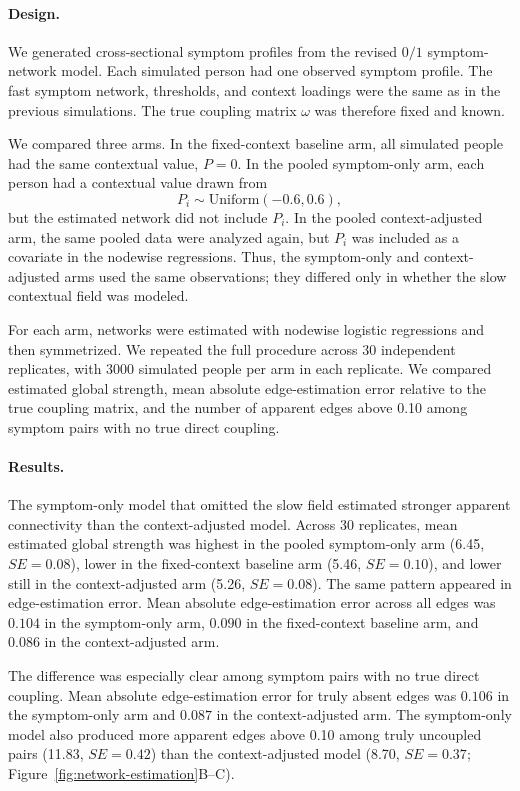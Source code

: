 \documentclass[man,12pt,floatsintext]{apa7}
\begin{document}
\paragraph{Design.}
We generated cross-sectional symptom profiles from the revised \(0/1\)
symptom-network model. Each simulated person had one observed symptom profile.
The fast symptom network, thresholds, and context loadings were the same as in
the previous simulations. The true coupling matrix \(\omega\) was therefore
fixed and known.

We compared three arms. In the fixed-context baseline arm, all simulated people
had the same contextual value, \(P=0\). In the pooled symptom-only arm, each
person had a contextual value drawn from
\[
P_i \sim \mathrm{Uniform}(-0.6,0.6),
\]
but the estimated network did not include \(P_i\). In the pooled
context-adjusted arm, the same pooled data were analyzed again, but \(P_i\) was
included as a covariate in the nodewise regressions. Thus, the symptom-only and
context-adjusted arms used the same observations; they differed only in whether
the slow contextual field was modeled.

For each arm, networks were estimated with nodewise logistic regressions
\parencite{ravikumar2010high, mukherjee2024logistic} and
then symmetrized. We repeated the full procedure across 30 independent
replicates, with 3000 simulated people per arm in each replicate. We compared estimated global strength, mean absolute edge-estimation error
relative to the true coupling matrix, and the number of apparent edges above 0.10 among symptom pairs with no true direct coupling.

\paragraph{Results.}
The symptom-only model that omitted the slow field estimated stronger apparent
connectivity than the context-adjusted model. Across 30 replicates, mean
estimated global strength was highest in the pooled symptom-only arm
(6.45, \(SE=0.08\)), lower in the fixed-context baseline arm
(5.46, \(SE=0.10\)), and lower still in the context-adjusted arm
(5.26, \(SE=0.08\)). The same pattern appeared in edge-estimation error. Mean
absolute edge-estimation error across all edges was \(0.104\) in the
symptom-only arm, \(0.090\) in the fixed-context baseline arm, and \(0.086\) in
the context-adjusted arm.

The difference was especially clear among symptom pairs with no true direct
coupling. Mean absolute edge-estimation error for truly absent edges was
\(0.106\) in the symptom-only arm and \(0.087\) in the context-adjusted arm.
The symptom-only model also produced more apparent edges above 0.10 among
truly uncoupled pairs (11.83, \(SE=0.42\)) than the context-adjusted model
(8.70, \(SE=0.37\); Figure~\ref{fig:network-estimation}B--C).
\end{document}
